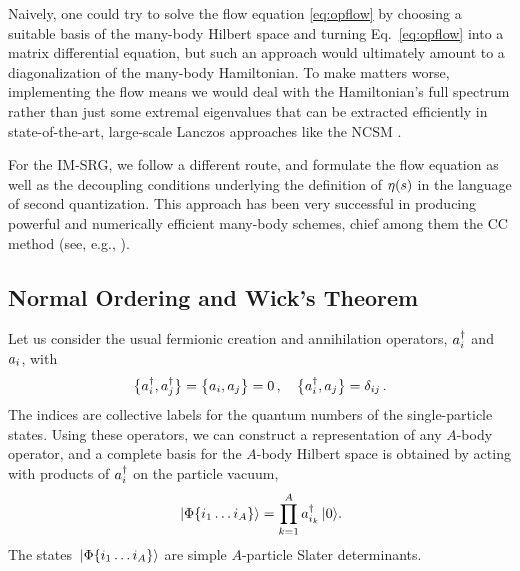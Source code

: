 Naively, one could try to solve the flow equation \eqref{eq:opflow} by choosing a suitable basis of the many-body Hilbert space and turning Eq.~\eqref{eq:opflow} into a matrix differential equation, but such an approach would ultimately amount to a
diagonalization of the many-body Hamiltonian. To make matters worse, implementing the flow means we would deal with the Hamiltonian's full spectrum rather than just some extremal eigenvalues that can be extracted efficiently in state-of-the-art, large-scale Lanczos approaches like the NCSM \cite{Navratil:2000hf,Barrett:2013oq}.

For the IM-SRG, we follow a different route, and formulate the flow equation as well as the decoupling conditions underlying the definition of $\eta(s)$ in the language of second quantization. This approach has been very successful in producing powerful and numerically efficient many-body schemes, chief among them the CC method (see, e.g., \cite{Coester:1958dq,Coester:1960cr,Shavitt:2009,Hagen:2010uq}). 

\subsection{\label{sec:nord}Normal Ordering and Wick's Theorem}
Let us consider the usual fermionic creation and annihilation operators, ${{a}}^{\dag}_i$ and $a_i$, with
\begin{equation}
   \big\{ {{{a}}^{\dag}_i}, {{{a}}^{\dag}_j} \big\}  =  \big\{ {a_i}, {a_j} \big\}  = 0\,,\quad  \big\{ {{{a}}^{\dag}_i}, {a_j} \big\} =\delta_{ij}\,.
\end{equation}
The indices are collective labels for the quantum numbers of the single-particle states. Using these operators, we can construct a representation of any $A$-body operator, and a complete basis for the $A$-body Hilbert space is obtained by acting with products of ${{a}}^{\dag}_i$ on the particle vacuum,
\begin{equation}\label{eq:vacbasis}
  \ket{\Phi\{i_1\ldots i_A\}}=\prod_{k=1}^A\aaO_{i_k}\ket{0}.
\end{equation}
The states $\,|{\Phi\{i_1\ldots i_A\}}\rangle$ are simple $A$-particle Slater determinants.

